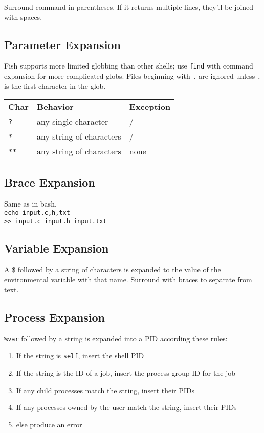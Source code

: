 \documentclass[10pt]{extarticle}
\begin{document}
\begin{paracol}{2}
Surround command in parentheses.
If it returns multiple lines, they'll be joined with spaces.

\subsection*{Parameter Expansion}

Fish supports more limited globbing than other shells; use \texttt{find} with command expansion for more complicated globs.
Files beginning with \texttt{.} are ignored unless \texttt{.} is the first character in the glob.

\begin{tabularx}{\columnwidth}{X X X}
    \rowcolor{DarkBackground}
    \textbf{Char} & \textbf{Behavior} & \textbf{Exception} \\
    \texttt{?} & any single character & / \\
    \texttt{*} & any string of characters & / \\
    \texttt{**} & any string of characters & none
\end{tabularx}

\subsection*{Brace Expansion}

Same as in bash.\\
\texttt{echo input.{c,h,txt}}\\
\texttt{>> input.c input.h input.txt}

\subsection*{Variable Expansion}

A \$ followed by a string of characters is expanded to the value of the environmental variable with that name.
Surround with braces to separate from text.

\subsection*{Process Expansion}

\texttt{\%var} followed by a string is expanded into a PID according these rules:

\begin{enumerate}
    \item If the string is \texttt{self}, insert the shell PID
    \item If the string is the ID of a job, insert the process group ID for
        the job
    \item If any child processes match the string, insert their PIDs
    \item If any processes owned by the user match the string, insert their PIDs
    \item else produce an error
\end{enumerate}


\end{paracol}
\end{document}
